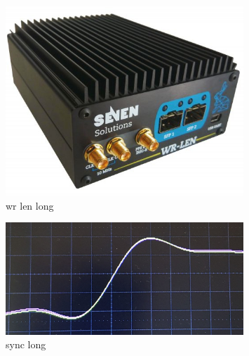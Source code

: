 \begin{figure} %
    \includegraphics[width=0.8\textwidth]{diagrams/6-daq/wr_len.jpg}
    \caption[wr len short]
    {wr len long}
    \label{fig:wr_len}
\end{figure} %

\begin{figure} %
    \includegraphics[width=0.8\textwidth]{diagrams/6-daq/sync.jpg}
    \caption[sync short]
    {sync long}
    \label{fig:sync}
\end{figure} %

